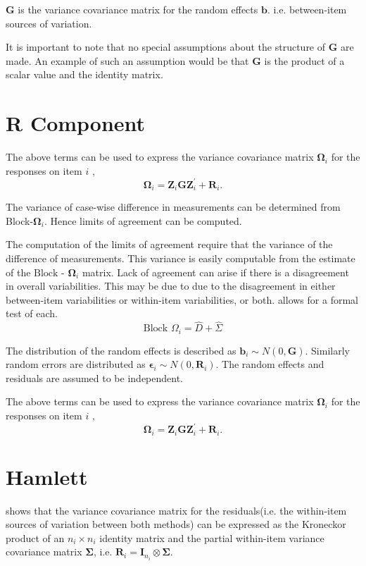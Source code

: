 \documentclass[12pt, a4paper]{report}
\theoremstyle{plain}
\theoremstyle{definition}
\theoremstyle{remark}
\begin{document}
$\boldsymbol{G}$ is the variance covariance matrix for the random effects $\boldsymbol{b}$.
i.e. between-item sources of variation.  

It is important to note that no special assumptions about the structure of $\boldsymbol{G}$ are made. An example of such an assumption would be that $\boldsymbol{G}$ is the product of a scalar value and the identity matrix.





\section{R Component}

The above terms can be used to express the  variance covariance matrix $\boldsymbol{\Omega}_i$ for the responses on item $i$ ,
\[
\boldsymbol{\Omega}_i = \boldsymbol{Z}_i \boldsymbol{G} \boldsymbol{Z}_i^{\prime} + \boldsymbol{R}_i.
\]



The variance of case-wise difference in measurements can be determined from Block-$\boldsymbol{\Omega}_{i}$. Hence limits of agreement can be computed.

The computation of the limits of agreement require that the variance of the difference of measurements. This variance is easily computable from the estimate of the ${\mbox{Block - }\boldsymbol \Omega_{i}}$ matrix. Lack of agreement can arise if there is a disagreement in overall variabilities. This may be due to due to the disagreement in either between-item
variabilities or within-item variabilities, or both. \citet{ARoy2009} allows for a formal test of each.
\begin{equation}
\mbox{Block  }\Omega_{i} = \hat{D} + \hat{\Sigma}
\end{equation}


The distribution of the random effects is described as $\boldsymbol{b}_i \sim N(0,\boldsymbol{G})$. Similarly  random errors are distributed as $\boldsymbol{\epsilon}_i \sim N(0,\boldsymbol{R}_i)$. The random effects and residuals are assumed to be independent.

The above terms can be used to express the  variance covariance matrix $\boldsymbol{\Omega}_i$ for the responses on item $i$ ,
\[
\boldsymbol{\Omega}_i = \boldsymbol{Z}_i \boldsymbol{G} \boldsymbol{Z}_i^{\prime} + \boldsymbol{R}_i.
\]

\section{Hamlett}
\citet{hamlett} shows that the variance covariance matrix for the residuals(i.e. the within-item sources of variation between both methods) can be expressed as the Kroneckor product of an $n_i \times n_i$ identity matrix and the partial within-item variance covariance matrix $\boldsymbol{\Sigma}$, i.e. $\boldsymbol{R}_{i} = \boldsymbol{I}_{n_{i}} \otimes \boldsymbol{\Sigma}$.
\end{document}
